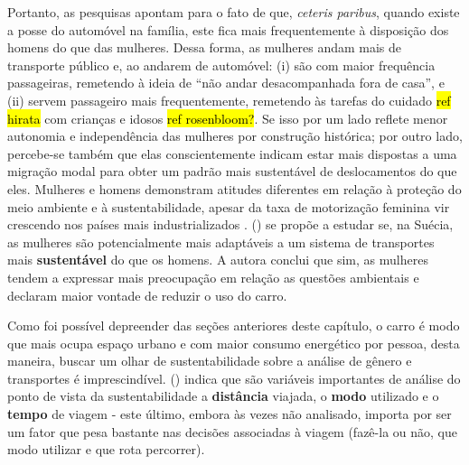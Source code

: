 

Portanto, as pesquisas apontam para o fato de que, \emph{ceteris paribus}, quando existe a posse do automóvel na família, este fica mais frequentemente à disposição dos homens do que das mulheres.
Dessa forma, as mulheres andam mais de transporte público e, ao andarem de automóvel: (i) são com maior frequência passageiras, remetendo à ideia de ``não andar desacompanhada fora de casa'', e (ii) servem passageiro mais frequentemente, remetendo às tarefas do cuidado \hl{ref hirata} com crianças e idosos \hl{ref rosenbloom?}.
Se isso por um lado reflete menor autonomia e independência das mulheres por construção histórica; por outro lado, percebe-se também que elas conscientemente indicam estar mais dispostas a uma migração modal para obter um padrão mais sustentável de deslocamentos do que eles. Mulheres e homens demonstram atitudes diferentes em relação à proteção do meio ambiente e à sustentabilidade, apesar da taxa de motorização feminina vir crescendo nos países mais industrializados \cite{ROOT1999}.  (\citeyear{POLK2003}) se propõe a estudar se, na Suécia, as mulheres são potencialmente mais adaptáveis a um sistema de transportes mais \textbf{sustentável} do que os homens. A autora conclui que sim, as mulheres tendem a expressar mais preocupação em relação as questões ambientais e declaram maior vontade de reduzir o uso do carro. 

Como foi possível depreender das seções anteriores deste capítulo, o carro é modo que mais ocupa espaço urbano e com maior consumo energético por pessoa, desta maneira, buscar um olhar de sustentabilidade sobre a análise de gênero e transportes é imprescindível.  (\citeyear{SCHWANEN2002}) indica que são variáveis importantes de análise do ponto de vista da sustentabilidade a \textbf{distância} viajada, o \textbf{modo} utilizado e o \textbf{tempo} de viagem - este último, embora às vezes não analisado, importa por ser um fator que pesa bastante nas decisões associadas à viagem (fazê-la ou não, que modo utilizar e que rota percorrer).


 


